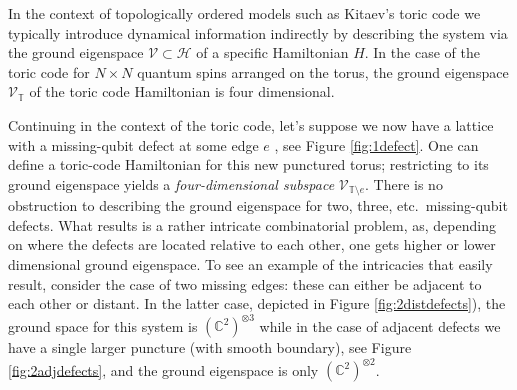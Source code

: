 In the context of topologically ordered models such as Kitaev's toric code \cite{Kit03} we typically introduce dynamical information indirectly by describing the system via the ground eigenspace $\mathcal{V}\subset \mathcal{H}$ of a specific Hamiltonian $H$. In the case of the toric code for $N\times N$ quantum spins arranged on the torus, the ground eigenspace $\mathcal{V}_{\mathbb{T}}$ of the toric code Hamiltonian is four dimensional.

Continuing in the context of the toric code, let's suppose we now have a lattice with a missing-qubit defect at some edge $e$ \cite{BLKW17}, see Figure \ref{fig:1defect}. One can define a toric-code Hamiltonian for this new punctured torus; restricting to its ground eigenspace yields a \emph{four-dimensional subspace} $\mathcal{V}_{\mathbb{T}\setminus e}$. There is no obstruction to describing the ground eigenspace for two, three, etc.\ missing-qubit defects. What results is a rather intricate combinatorial problem, as, depending on where the defects are located relative to each other, one gets higher or lower dimensional ground eigenspace. To see an example of the intricacies that easily result, consider the case of two missing edges: these can either be adjacent to each other or distant. In the latter case, depicted in Figure \ref{fig:2distdefects}), the ground space for this system is $(\mathbb{C}^2)^{\otimes 3}$ while in the case of adjacent defects we have a single larger puncture (with smooth boundary), see Figure \ref{fig:2adjdefects}, and the ground eigenspace is only $(\mathbb{C}^2)^{\otimes 2}$.

